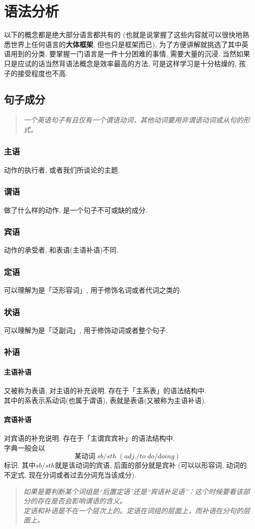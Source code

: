 \documentclass[a4paper]{article}
\begin{document}
\section{语法分析}
以下的概念都是绝大部分语言都共有的 (也就是说掌握了这些内容就可以很快地熟悉世界上任何语言的\textbf{大体框架}, 但也只是框架而已), 为了方便讲解就挑选了其中英语用到的分类. 要掌握一门语言是一件十分困难的事情, 需要大量的沉浸. 当然如果只是应试的话当然背语法概念是效率最高的方法, 可是这样学习是十分枯燥的, 孩子的接受程度也不高. 

\subsection{句子成分}
\begin{quote}
  \textit{一个英语句子有且仅有一个谓语动词，其他动词要用非谓语动词或从句的形式。}
\end{quote}
\subsubsection{主语}
动作的执行者, 或者我们所谈论的主题. 
\subsubsection{谓语}
做了什么样的动作, 是一个句子不可或缺的成分. 
\subsubsection{宾语}
动作的承受者, 和表语(主语补语)不同. 
\subsubsection{定语}
可以理解为是「泛形容词」, 用于修饰名词或者代词之类的. 
\subsubsection{状语}
可以理解为是「泛副词」, 用于修饰动词或者整个句子. 
\subsubsection{补语}
\paragraph{主语补语}
又被称为表语, 对主语的补充说明. 存在于「主系表」的语法结构中. \\
其中的系表示系动词(也属于谓语), 表就是表语(又被称为主语补语). 
\paragraph{宾语补语}
对宾语的补充说明. 存在于「主谓宾宾补」的语法结构中. \\
字典一般会以
$$\text{某动词}\;sb/sth\;(adj./to\;do/doing)$$
标识. 其中$sb/sth$就是该动词的宾语, 后面的部分就是宾补 (可以以形容词, 动词的不定式, 现在分词或者过去分词充当该成分). 
\begin{quote}
  \textit{如果是要判断某个词组是“后置定语”还是“宾语补足语”：这个时候要看该部分的存在是否会影响谓语的含义。\\
  定语和补语是不在一个层次上的。定语在词组的层面上，而补语在分句的层面上。}
\end{quote}
\end{document}
